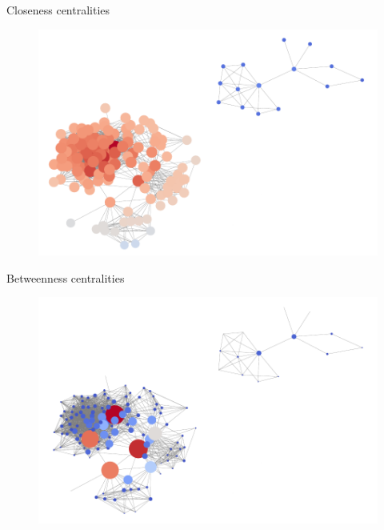 \documentclass{beamer}
\begin{document}
\begin{frame} {Closeness centralities}
\begin{figure}[h!t]\center
\includegraphics[width=1\textwidth]{closeness_centralities.pdf}
\label{fig4}
\end{figure}
\end{frame}

\begin{frame} {Betweenness centralities}
\begin{figure}[h!t]\center
\includegraphics[width=1\textwidth]{betweenness_centralities.pdf}
\label{fig5}
\end{figure}
\end{frame}
\end{document}
